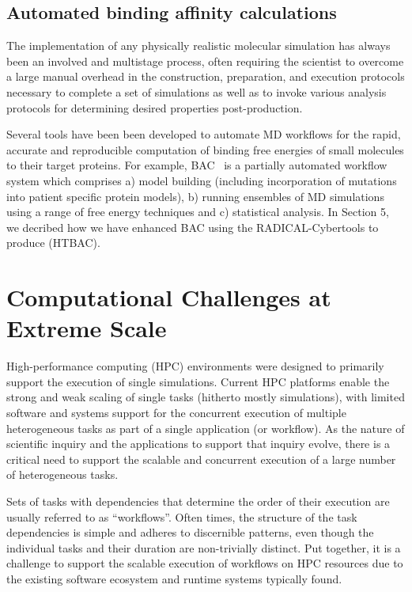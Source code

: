 \documentclass[conference]{IEEEtran}
\begin{document}
%
\subsection{Automated binding affinity calculations}

%
%
%
%

The implementation of any physically realistic molecular simulation has
always been an involved and multistage process, often requiring the scientist
to overcome a large manual overhead in the construction, preparation, and
execution protocols necessary to complete a set of simulations as well as to
invoke various analysis protocols for determining desired properties
post-production.

Several tools have been been developed to automate MD workflows for the rapid,
accurate and reproducible computation of binding free energies of small
molecules to their target proteins. For example, BAC~\cite{Sadiq2008} is a
partially automated workflow system which comprises a) model building (including
incorporation of mutations into patient specific protein models), b) running
ensembles of MD simulations using a range of free energy techniques and c)
statistical analysis. In Section 5, we decribed how we have enhanced BAC using the RADICAL-Cybertools to produce (HTBAC).

%

%
%
%


%
%
%
%
%
%
%
%
%

%
%
%
%
%
%
%
%
%
%
%
%
%
%
%
%
%
%
%
%
 

%
%
%
\section{Computational Challenges at Extreme Scale}\label{sec:3}
%
%

High-performance computing (HPC) environments were designed to primarily
support the execution of single simulations. Current HPC platforms enable the
strong and weak scaling of single tasks (hitherto mostly simulations), with
limited software and systems support for the concurrent execution of multiple
heterogeneous tasks as part of a single application (or workflow). As the
nature of scientific inquiry and the applications to support that inquiry
evolve, there is a critical need to support the scalable and concurrent
execution of a large number of heterogeneous tasks.

%
%

%
%
Sets of tasks with dependencies that determine the order of their execution
are usually referred to as ``workflows''. Often times, the structure of the
task dependencies is simple and adheres to discernible patterns, even though
the individual tasks and their duration are non-trivially distinct. Put
together, it is a challenge to support the scalable execution of workflows on
HPC resources due to the existing software ecosystem and runtime systems
typically found.
\end{document}
